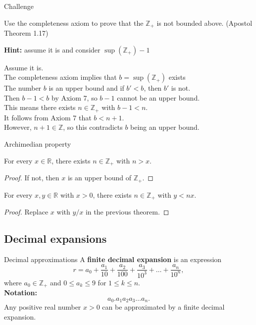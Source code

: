 \documentclass{beamer}
\begin{document}
\begin{frame}{Challenge}
\begin{prob}
Use the completeness axiom to prove that the $\mathbb Z_+$ is not bounded above.
(Apostol Theorem 1.17)
\end{prob}
\pause
\textbf{Hint:} assume it is and consider $\sup(\mathbb Z_+)-1$
\pause
\begin{soln}
Assume it is.\\\pause
The completeness axiom implies that $b=\sup(\mathbb Z_+)$ exists\\\pause
The number $b$ is an upper bound and if $b' < b$, then $b'$ is not.\\\pause
Then $b-1 < b$ by Axiom 7, so $b-1$ cannot be an upper bound.\\\pause
This means there exists $n\in\mathbb{Z}_+$ with $b-1 < n$.\\\pause
It follows from Axiom 7 that $b < n+1$.\\\pause
However, $n+1\in\mathbb{Z}$, so this contradicts $b$ being an upper bound.
\end{soln}
\end{frame}

\begin{frame}{Archimedian property}
\begin{thm}
For every $x\in\mathbb{R}$, there exists $n\in\mathbb{Z}_+$ with $n>x$.
\end{thm}
\pause
\begin{proof}
If not, then $x$ is an upper bound of $\mathbb{Z}_+$.
\end{proof}
\pause
\begin{thm}
For every $x,y\in\mathbb{R}$ with $x>0$, there exists $n\in\mathbb{Z}_+$ with $y<nx$.
\end{thm}
\pause
\begin{proof}
Replace $x$ with $y/x$ in the previous theorem.
\end{proof}
\end{frame}

\subsection{Decimal expansions}

\begin{frame}{Decimal approximations}
A \textbf{finite decimal expansion} is an expression
$$r = a_0 + \frac{a_1}{10} + \frac{a_2}{100} + \frac{a_3}{10^3} + \dots + \frac{a_n}{10^n},$$
where $a_0\in\mathbb Z_+$ and $0\leq a_k\leq 9$ for $1\leq k\leq n$.\\
\pause
\textbf{Notation:}
$$a_0.a_1a_2a_3\dots a_n.$$
\pause
Any positive real number $x>0$ can be approximated by a finite decimal expansion.
\end{frame}
\end{document}
